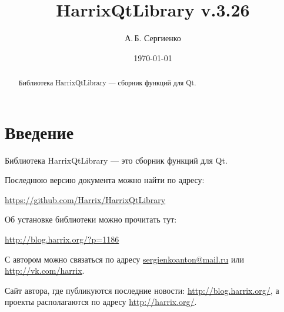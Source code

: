 \documentclass[a4paper,12pt]{article}
\title{HarrixQtLibrary v.3.26}
\author{А.\,Б. Сергиенко}
\date{\today}
\begin{document}


\maketitle

\begin{abstract}
Библиотека HarrixQtLibrary --- сборник функций для Qt.
\end{abstract}

\tableofcontents

\newpage

\section{Введение}

Библиотека HarrixQtLibrary --- это сборник функций для Qt.

Последнюю версию документа можно найти по адресу:

\href{https://github.com/Harrix/HarrixQtLibrary}{https://github.com/Harrix/HarrixQtLibrary}

Об установке библиотеки можно прочитать тут:

\href{http://blog.harrix.org/?p=1186}{http://blog.harrix.org/?p=1186}

С автором можно связаться по адресу \href{mailto:sergienkoanton@mail.ru}{sergienkoanton@mail.ru} или  \href{http://vk.com/harrix}{http://vk.com/harrix}.

Сайт автора, где публикуются последние новости: \href{http://blog.harrix.org/}{http://blog.harrix.org/}, а проекты располагаются по адресу \href{http://harrix.org/}{http://harrix.org/}.

\newpage
\end{document}
